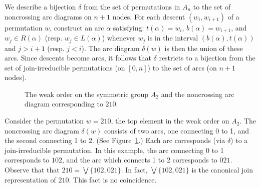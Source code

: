\documentclass[ALCO,ThmDefs,Unicode,epreuves]{cedram}
\renewcommand{\Join}{\bigvee}
\renewcommand{\1}{\hat{1}}
\newcommand{\0}{\hat{0}}
\begin{document}
We describe a bijection $\delta$ from the set of permutations in $A_n$
to the set of noncrossing arc diagrams on $n+1$ nodes.
For each descent $(w_i,w_{i+1})$ of a permutation $w$, construct an arc
$\alpha$ satisfying: $t(\alpha)=w_i$, $b(\alpha)=w_{i+1}$, 
and $w_j \in R(\alpha)$ (resp. $w_j \in L(\alpha)$) whenever $w_j$ is
in the interval $(b(\alpha),t(\alpha))$ and $j>i+1$
(resp. $j<i$). 
The arc diagram $\delta(w)$ is then the union of these arcs. 
Since descents become arcs, it follows that $\delta$ restricts to a bijection from the set of join-irreducible permutations (on $[0,n]$) to the set of arcs (on $n+1$ nodes).
\begin{figure}[htb]
 \centering
 \caption{The weak order on the symmetric group $A_2$ and the noncrossing arc diagram corresponding to $210$.}
 \label{cayley}
\end{figure}
\begin{example}\label{delta example}
\normalfont
Consider the permutation $w= 210$, the top element in the weak order on $A_2$.
The noncrossing arc diagram $\delta(w)$ consists of two arcs, one connecting 0 to 1, and the second connecting 1 to 2.
(See Figure~\ref{cayley}.)
Each arc corresponds (via $\delta$) to a join-irreducible permutation.
In this example, the arc connecting 0 to 1 corresponds to $102$, and the arc which connects 1 to 2 corresponds to $021$.
Observe that that $210 = \Join \{102, 021\}$.
In fact, $\Join \{102, 021\}$ is the canonical join representation of $210$.
This fact is no coincidence.
\end{example}
\end{document}

